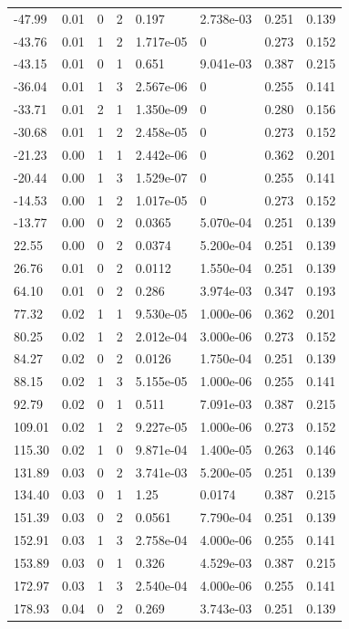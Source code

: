 \documentclass[preview]{standalone}
\begin{document}
{{\begin{tabular}{L{1.2cm}C{1.2cm} C{0.3cm}C{0.5cm} C{1.4cm}C{1.4cm} C{1.4cm}C{1.4cm}}
  -47.99  &  0.01  & 0     &  2 &  0.197  & 2.738e-03  & 0.251 &  0.139   \\ 
  -43.76  &  0.01  & 1     &  2 &  1.717e-05  & 0  & 0.273 &  0.152   \\ 
  -43.15  &  0.01  & 0     &  1 &  0.651  & 9.041e-03  & 0.387 &  0.215   \\ 
  -36.04  &  0.01  & 1     &  3 &  2.567e-06  & 0  & 0.255 &  0.141   \\ 
  -33.71  &  0.01  & 2     &  1 &  1.350e-09  & 0  & 0.280 &  0.156   \\ 
  -30.68  &  0.01  & 1     &  2 &  2.458e-05  & 0  & 0.273 &  0.152   \\ 
  -21.23  &  0.00  & 1     &  1 &  2.442e-06  & 0  & 0.362 &  0.201   \\ 
  -20.44  &  0.00  & 1     &  3 &  1.529e-07  & 0  & 0.255 &  0.141   \\ 
  -14.53  &  0.00  & 1     &  2 &  1.017e-05  & 0  & 0.273 &  0.152   \\ 
  -13.77  &  0.00  & 0     &  2 &  0.0365  & 5.070e-04  & 0.251 &  0.139   \\ 
  22.55  &  0.00  & 0     &  2 &  0.0374  & 5.200e-04  & 0.251 &  0.139   \\ 
  26.76  &  0.01  & 0     &  2 &  0.0112  & 1.550e-04  & 0.251 &  0.139   \\ 
  64.10  &  0.01  & 0     &  2 &  0.286  & 3.974e-03  & 0.347 &  0.193   \\ 
  77.32  &  0.02  & 1     &  1 &  9.530e-05  & 1.000e-06  & 0.362 &  0.201   \\ 
  80.25  &  0.02  & 1     &  2 &  2.012e-04  & 3.000e-06  & 0.273 &  0.152   \\ 
  84.27  &  0.02  & 0     &  2 &  0.0126  & 1.750e-04  & 0.251 &  0.139   \\ 
  88.15  &  0.02  & 1     &  3 &  5.155e-05  & 1.000e-06  & 0.255 &  0.141   \\ 
  92.79  &  0.02  & 0     &  1 &  0.511  & 7.091e-03  & 0.387 &  0.215   \\ 
  109.01  &  0.02  & 1     &  2 &  9.227e-05  & 1.000e-06  & 0.273 &  0.152   \\ 
  115.30  &  0.02  & 1     &  0 &  9.871e-04  & 1.400e-05  & 0.263 &  0.146   \\ 
  131.89  &  0.03  & 0     &  2 &  3.741e-03  & 5.200e-05  & 0.251 &  0.139   \\ 
  134.40  &  0.03  & 0     &  1 &  1.25  & 0.0174  & 0.387 &  0.215   \\ 
  151.39  &  0.03  & 0     &  2 &  0.0561  & 7.790e-04  & 0.251 &  0.139   \\ 
  152.91  &  0.03  & 1     &  3 &  2.758e-04  & 4.000e-06  & 0.255 &  0.141   \\ 
  153.89  &  0.03  & 0     &  1 &  0.326  & 4.529e-03  & 0.387 &  0.215   \\ 
  172.97  &  0.03  & 1     &  3 &  2.540e-04  & 4.000e-06  & 0.255 &  0.141   \\ 
  178.93  &  0.04  & 0     &  2 &  0.269  & 3.743e-03  & 0.251 &  0.139   \\ 
\hline 
\end{tabular} 

}}
\end{document}
